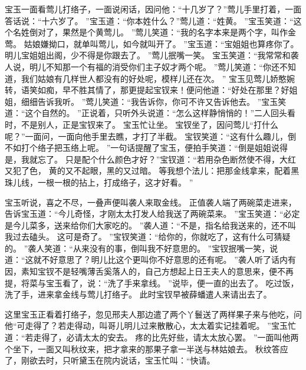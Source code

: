 \par
宝玉一面看莺儿打络子，一面说闲话，因问他：“十几岁了？”莺儿手里打着，一面答话说：“十六岁了。
”宝玉道：“你本姓什么？”莺儿道：“姓黄。
”宝玉笑道：“这个名姓倒对了，果然是个黄莺儿。
”莺儿笑道：“我的名字本来是两个字，叫作金莺。
姑娘嫌拗口，就单叫莺儿，如今就叫开了。
”宝玉道：“宝姐姐也算疼你了。
明儿宝姐姐出阁，少不得是你跟去了。
”莺儿抿嘴一笑。
宝玉笑道：“我常常和袭人说，明儿不知那一个有福的消受你们主子奴才两个呢。
”莺儿笑道：“你还不知道，我们姑娘有几样世人都没有的好处呢，模样儿还在次。
”
宝玉见莺儿娇憨婉转，语笑如痴，早不胜其情了，那更提起宝钗来！便问他道：“好处在那里？好姐姐，细细告诉我听。
”莺儿笑道：“我告诉你，你可不许又告诉他去。
”宝玉笑道：“这个自然的。
”正说着，只听外头说道：“怎么这样静悄悄的！”二人回头看时，不是别人，正是宝钗来了。
宝玉忙让坐。
宝钗坐了，因问莺儿“打什么呢？”一面问，一面向他手里去瞧，才打了半截。
宝钗笑道：“这有什么趣儿，倒不如打个络子把玉络上呢。
”一句话提醒了宝玉，便拍手笑道：“倒是姐姐说得是，我就忘了。
只是配个什么颜色才好？”宝钗道：“若用杂色断然使不得，大红又犯了色，
黄的又不起眼，黑的又过暗。
等我想个法儿：把那金线拿来，配着黑珠儿线，一根一根的拈上，打成络子，这才好看。
”\par
宝玉听说，喜之不尽，一叠声便叫袭人来取金线。
正值袭人端了两碗菜走进来，告诉宝玉道：“今儿奇怪，才刚太太打发人给我送了两碗菜来。
”宝玉笑道：“必定是今儿菜多，送来给你们大家吃的。
”袭人道：“不是，指名给我送来的，还不叫我过去磕头。
这可是奇了。
”宝钗笑道：“给你的，你就吃了，这有什么可猜疑的。
”袭人笑道：“从来没有的事，倒叫我不好意思的。
”宝钗抿嘴一笑，说道：“这就不好意思了？明儿比这个更叫你不好意思的还有呢。
”袭人听了话内有因，素知宝钗不是轻嘴薄舌奚落人的，自己方想起上日王夫人的意思来，便不再提，将菜与宝玉看了，说：“洗了手来拿线。
”说毕，便一直的出去了。
吃过饭，洗了手，进来拿金线与莺儿打络子。
此时宝钗早被薛蟠遣人来请出去了。
\par
这里宝玉正看着打络子，忽见邢夫人那边遣了两个丫鬟送了两样果子来与他吃，问他“可走得了？若走得动，叫哥儿明儿过来散散心，太太着实记挂着呢。
”宝玉忙道：“若走得了，必请太太的安去。
疼的比先好些，请太太放心罢。
”一面叫他两个坐下，一面又叫秋纹来，把才拿来的那果子拿一半送与林姑娘去。
秋纹答应了，刚欲去时，只听黛玉在院内说话，宝玉忙叫：“快请。
